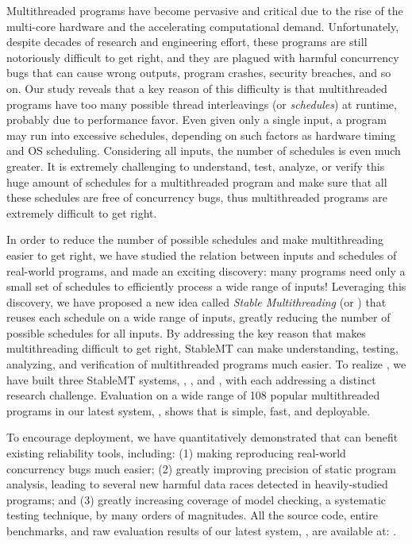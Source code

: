 Multithreaded programs have become pervasive and critical due to the rise of the
multi-core hardware and the accelerating computational demand.
Unfortunately, despite decades of research and engineering effort, these
programs are still notoriously difficult to get right, and they are plagued with
harmful concurrency bugs that can cause wrong outputs, program crashes, security
breaches, and so on. Our study reveals that a key reason of this difficulty is
that multithreaded programs have too many possible thread interleavings (or
\emph{schedules}) at runtime, probably due to performance favor. Even given only a
single input, a program may run into excessive schedules, depending on such
factors as hardware timing and OS scheduling. Considering all inputs, the number
of schedules is even much greater. It is extremely challenging to understand,
test, analyze, or verify this huge amount of schedules for a
multithreaded program and make sure that all these schedules are free of concurrency
bugs, thus multithreaded programs are extremely difficult to get right.

In order to reduce the number of possible schedules and make multithreading
easier to get right, we have studied the
relation between inputs and schedules of real-world programs, and made an
exciting discovery: many programs need only a small set of schedules to
efficiently process a wide range of inputs! Leveraging this discovery, we have
proposed a new idea called \emph{Stable Multithreading} (or \emph{\smt}) that reuses each
schedule on a wide range of inputs, greatly reducing the number of possible
schedules for all inputs. By addressing the key reason that makes multithreading
difficult to get right, StableMT can make understanding,
testing, analyzing, and verification of multithreaded programs much
easier. To realize \smt, we have built three StableMT systems, \tern,
\peregrine, and \parrot, with each addressing a distinct research challenge.
Evaluation on a wide range of 108 popular multithreaded programs in
our latest \smt system, \parrot, shows that \smt is simple, fast, and
deployable.

To encourage \smt deployment, we have quantitatively demonstrated that \smt 
can benefit existing reliability tools, including: (1) making reproducing
real-world concurrency bugs much easier;  (2) greatly improving precision of
static program analysis, leading to several new harmful data races detected in
heavily-studied programs; and (3) greatly increasing coverage of model checking,
a systematic testing technique, by many orders of magnitudes. All the source
code, entire benchmarks, and raw evaluation results of our latest \smt system,
\parrot, are available at: \github.

